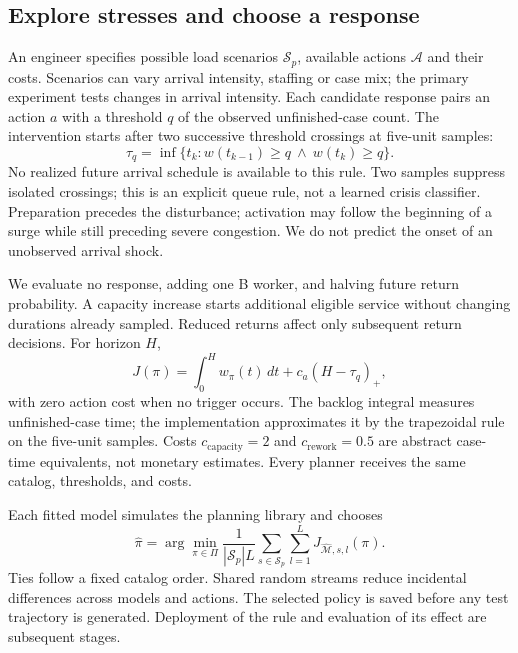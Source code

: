 \documentclass[runningheads]{llncs}
\begin{document}
\subsection{Explore stresses and choose a response}
An engineer specifies possible load scenarios $\mathcal S_p$, available actions $\mathcal A$ and their costs. Scenarios can vary arrival intensity, staffing or case mix; the primary experiment tests changes in arrival intensity. Each candidate response pairs an action $a$ with a threshold $q$ of the observed unfinished-case count. The intervention starts after two successive threshold crossings at five-unit samples:
\begin{equation}\label{eq:trigger}
\tau_q=\inf\{t_k:w(t_{k-1})\geq q\ \land\ w(t_k)\geq q\}.
\end{equation}
No realized future arrival schedule is available to this rule. Two samples suppress isolated crossings; this is an explicit queue rule, not a learned crisis classifier. Preparation precedes the disturbance; activation may follow the beginning of a surge while still preceding severe congestion. We do not predict the onset of an unobserved arrival shock.

We evaluate no response, adding one B worker, and halving future return probability. A capacity increase starts additional eligible service without changing durations already sampled. Reduced returns affect only subsequent return decisions. For horizon $H$,
\begin{equation}\label{eq:cost}
J(\pi)=\int_0^H w_\pi(t)\,dt+c_a(H-\tau_q)_+,
\end{equation}
with zero action cost when no trigger occurs. The backlog integral measures unfinished-case time; the implementation approximates it by the trapezoidal rule on the five-unit samples. Costs $c_{\mathrm{capacity}}=2$ and $c_{\mathrm{rework}}=0.5$ are abstract case-time equivalents, not monetary estimates. Every planner receives the same catalog, thresholds, and costs.

Each fitted model simulates the planning library and chooses
\begin{equation}\label{eq:policy}
\widehat\pi=\arg\min_{\pi\in\Pi}\frac{1}{|\mathcal S_p|L}
\sum_{s\in\mathcal S_p}\sum_{l=1}^{L}J_{\widehat{\mathcal M},s,l}(\pi).
\end{equation}
Ties follow a fixed catalog order. Shared random streams reduce incidental differences across models and actions. The selected policy is saved before any test trajectory is generated. Deployment of the rule and evaluation of its effect are subsequent stages.
\end{document}
